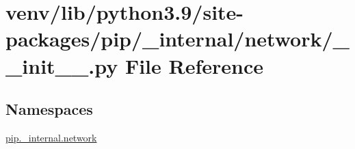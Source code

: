 \hypertarget{venv_2lib_2python3_89_2site-packages_2pip_2__internal_2network_2____init_____8py}{}\section{venv/lib/python3.9/site-\/packages/pip/\+\_\+internal/network/\+\_\+\+\_\+init\+\_\+\+\_\+.py File Reference}
\label{venv_2lib_2python3_89_2site-packages_2pip_2__internal_2network_2____init_____8py}
\subsection*{Namespaces}
\begin{DoxyCompactItemize}
\item 
 \hyperlink{namespacepip_1_1__internal_1_1network}{pip.\+\_\+internal.\+network}
\end{DoxyCompactItemize}
